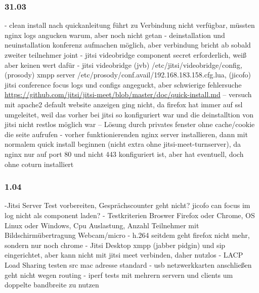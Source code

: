 \documentclass[english,runningheads,a4paper]{llncs}[2018/03/10]
\begin{document}
\subsubsection{31.03}
- clean install nach quickanleitung führt zu Verbindung nicht verfügbar, müssten nginx logs angucken warum, aber noch nicht getan
- deinstallation und neuinstallation konferenz aufmachen möglich, aber verbindung bricht ab sobald zweiter teilnehmer joint
- jitsi videobridge component secret erforderlich, weiß aber keinen wert dafür
- jitsi videobridge (jvb) /etc/jitsi/videobridge/config, (prosody) xmpp server /etc/prosody/conf.avail/192.168.183.158.cfg.lua, (jicofo) jitsi conference focus logs und configs angeguckt, aber schwierige fehlersuche
\url{https://github.com/jitsi/jitsi-meet/blob/master/doc/quick-install.md}
-- versuch mit apache2 default website anzeigen ging nicht, da  firefox hat immer auf ssl umgeleitet, weil das vorher bei jitsi so konfiguriert war und die deinstalltion von jitsi nicht restlos möglich war
-- Lösung durch privates fenster ohne cache/cookie die seite aufrufen
- vorher funktionierenden nginx server installieren, dann mit normalem quick install beginnen (nicht extra ohne jitsi-meet-turnserver), da nginx nur auf port 80 und nicht 443 konfiguriert ist, aber hat eventuell, doch ohne coturn installiert

\subsubsection{1.04}
-Jitsi Server Test vorbereiten, Gesprächscounter geht nicht? jicofo can focus im log nicht als component laden?
- Testkriterien Broswer Firefox oder Chrome, OS Linux oder Windows, Cpu Auslastung, Anzahl Teilnehmer mit Bildschirmübertragung Webcam/micro
- h.264 seitdem geht firefox nicht mehr, sondern nur noch chrome
- Jitsi Desktop xmpp (jabber pidgin) und sip eingerichtet, aber kann nicht mit jitsi meet verbinden, daher nutzlos
- LACP Load Sharing testen src mac adresse standard
- usb netzwerkkarten anschließen geht nicht wegen routing
- iperf tests mit mehrern servern und clients um doppelte bandbreite zu nutzen
\end{document}
